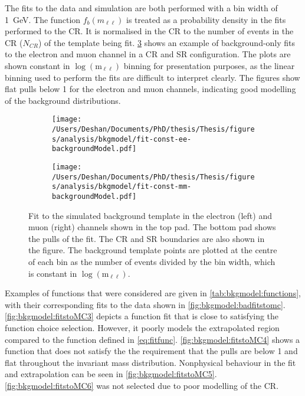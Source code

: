 The fits to the data and simulation are both performed with a bin width of \SI{1}{\giga\electronvolt}. The function $f_b(m_{\ell\ell})$ is treated as a probability density in the fits performed to the CR. It is normalised in the CR to the number of events in the CR ($N_{CR}$) of the template being fit. \cref{fig:bkgmodel:fitstoMC} shows an example of background-only fits to the electron and muon channel in a CR and SR configuration. The plots are shown constant in $\log{(\text{m}_{\ell\ell})}$ binning for presentation purposes, as the linear binning used to perform the fits are difficult to interpret clearly. The figures show flat pulls below 1 for the electron and muon channels, indicating good modelling of the background distributions. 

\begin{figure}[h!]
    \centering
    \begin{subfigure}[b]{0.49\textwidth}
        \centering
        \texttt{[image: /Users/Deshan/Documents/PhD/thesis/Thesis/figures/analysis/bkgmodel/fit-const-ee-backgroundModel.pdf]}
        \label{fig:fitstoMC1}
    \end{subfigure}
    \begin{subfigure}[b]{0.49\textwidth}
        \centering
        \texttt{[image: /Users/Deshan/Documents/PhD/thesis/Thesis/figures/analysis/bkgmodel/fit-const-mm-backgroundModel.pdf]}
        \label{fig:fitstoMC2}
    \end{subfigure}
    \caption[Fits to the simulated background template in the electron and muon channels]{Fit to the simulated background template in the electron (left) and muon (right) channels shown in the top pad. The bottom pad shows the pulls of the fit. The CR and SR boundaries are also shown in the figure. The background template points are plotted at the centre of each bin as the number of events divided by the bin width, which is constant in $\log{(\text{m}_{\ell\ell})}$.}
    \label{fig:bkgmodel:fitstoMC}
\end{figure}

Examples of functions that were considered are given in \cref{tab:bkgmodel:functions}, with their corresponding fits to the data shown in \cref{fig:bkgmodel:badfitstomc}. \cref{fig:bkgmodel:fitstoMC3} depicts a function fit that is close to satisfying the function choice selection. However, it poorly models the extrapolated region compared to the function defined in \cref{eq:fitfunc}. \cref{fig:bkgmodel:fitstoMC4} shows a function that does not satisfy the the requirement that the pulls are below 1 and flat throughout the invariant mass distribution. Nonphysical behaviour in the fit and  extrapolation can be seen in \cref{fig:bkgmodel:fitstoMC5}. \cref{fig:bkgmodel:fitstoMC6} was not selected due to poor modelling of the CR. 

